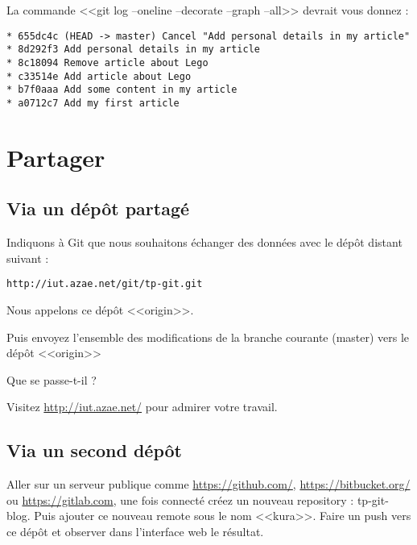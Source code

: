 \documentclass[a4paper]{article}
\begin{document}
La commande <<git log --oneline --decorate --graph --all>> devrait vous donnez :
\begin{verbatim}
* 655dc4c (HEAD -> master) Cancel "Add personal details in my article"
* 8d292f3 Add personal details in my article
* 8c18094 Remove article about Lego
* c33514e Add article about Lego
* b7f0aaa Add some content in my article
* a0712c7 Add my first article
\end{verbatim}

\section{Partager}

\subsection{Via un dépôt partagé}

Indiquons à Git que nous souhaitons échanger des données avec le dépôt distant suivant : \begin{verbatim}http://iut.azae.net/git/tp-git.git\end{verbatim}
Nous appelons ce dépôt <<origin>>.

Puis envoyez l'ensemble des modifications de la branche courante (master) vers le dépôt <<origin>>

Que se passe-t-il ?

Visitez \url{http://iut.azae.net/} pour admirer votre travail.

\subsection{Via un second dépôt}

Aller sur un serveur publique comme \url{https://github.com/}, \url{https://bitbucket.org/} ou \url{https://gitlab.com}, une fois connecté créez un nouveau repository : tp-git-blog. Puis ajouter ce nouveau remote sous le nom <<kura>>. Faire un push vers ce dépôt et observer dans l'interface web le résultat.
\end{document}
